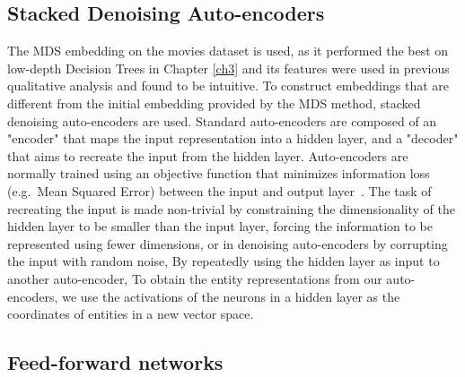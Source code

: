 


\subsection{Stacked Denoising Auto-encoders}


The MDS embedding on the movies dataset is used, as it performed the best on low-depth Decision Trees in Chapter \ref{ch3} and its features were used in previous qualitative analysis and found to be intuitive. To construct embeddings that are different from the initial embedding provided by the MDS method, stacked denoising auto-encoders \cite{Vincent2008a} are used. Standard auto-encoders are composed of an "encoder" that maps the input representation into a hidden layer, and a "decoder" that aims to recreate the input from the hidden layer. Auto-encoders are normally trained using an objective function that minimizes information loss (e.g.\ Mean Squared Error) between the input and output layer~\cite{Bengio2009}. The task of recreating the input is made non-trivial by constraining the dimensionality of the hidden layer to be smaller than the input layer, forcing the information to be represented using fewer dimensions, or in denoising auto-encoders by corrupting the input with random noise,  By repeatedly  using the hidden layer as input to another auto-encoder, To obtain the entity representations from our auto-encoders, we use the activations of the neurons in a hidden layer as the coordinates of entities in a new vector space. 

\subsection{Feed-forward networks}

